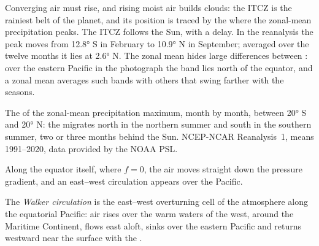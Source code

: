 Converging air must rise, and rising moist air builds clouds: the ITCZ is the rainiest
belt of the planet, and its position is traced by the  where the zonal-mean
precipitation peaks. The ITCZ follows the Sun, with a delay. In the reanalysis the
peak moves from \ang{12.8} S in February to \ang{10.9} N in September; averaged over
the twelve months it lies at \ang{2.6} N. The zonal mean hides large differences
between : over the eastern Pacific in the photograph the band lies north
of the equator, and a zonal mean averages such bands with others that swing farther
with the seasons.

\begin{omfigure}

{\small The  of the zonal-mean precipitation maximum, month by month, between
\ang{20} S and \ang{20} N: the  migrates north in the
northern summer and south in the southern summer, two or three months behind the
Sun.
NCEP-NCAR Reanalysis~1, means 1991--2020, data provided by the NOAA PSL.}
\label{fig:b1:atmospheric-circulation:itcz}
\end{omfigure}

Along the equator itself, where $f = 0$, the air moves straight down the pressure
gradient, and an east--west circulation appears over the Pacific.

\begin{definition}\label{def:b1:atmospheric-circulation:walker}
The \emph{Walker circulation} is the east--west overturning
cell of the atmosphere along the equatorial Pacific: air rises over the warm waters
of the west, around the Maritime Continent, flows east aloft, sinks over the eastern
Pacific and returns westward near the surface with the .
\end{definition}

